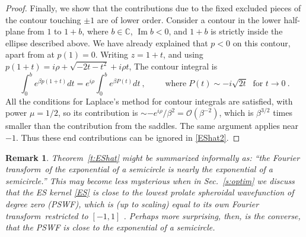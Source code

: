 \documentclass[10pt]{article}
\newcommand{\bigO}{{\mathcal O}}
\DeclareMathOperator{\im}{Im}
\newtheorem{rmk}[thm]{Remark}
\newcommand{\freq}{\beta}          %
\newcommand{\FT}{Fourier transform}
\begin{document}
\begin{proof}
Finally, we show that the contributions due to the fixed excluded
pieces of the contour touching $\pm1$ are of lower order.
Consider a contour in the lower half-plane
from $1$ to $1+b$, where $b\in\mathbb{C}$, $\im b<0$,
and $1+b$ is strictly inside the ellipse described above.
We have already explained that $p<0$ on this contour, apart from at $p(1)=0$.
Writing $z=1+t$, and using $p(1+t) = i\rho + \sqrt{-2t-t^2} + i\rho t$,
The contour integral is
$$ \int_0^b e^{\freq p(1+t)} dt = e^{i\rho}\int_0^b e^{\freq P(t)} dt
~,\qquad \mbox{ where} \; P(t) \sim -i\sqrt{2t} \; \mbox{ for } t\to 0~.
$$
All the conditions for
Laplace's method for contour integrals \cite[Thm.~6.1, p.~125]{olver}
are satisfied, with power $\mu=1/2$,
so its contribution is $\sim -e^{i\rho}/\freq^2 = \bigO(\freq^{-2})$,
which is $\freq^{3/2}$ times smaller than the contribution from the saddles.
The same argument applies near $-1$.
Thus these end contributions can be ignored in \eqref{EShat2}.
\end{proof}

\begin{rmk}
  Theorem~\ref{t:EShat} might be summarized informally as:
  ``the \FT\ of the exponential
  of a semicircle is nearly the exponential of a semicircle.''
  This may become less mysterious when
    in Sec.~\ref{s:optim} we discuss that
    the ES kernel \eqref{ES} is close
    to the lowest prolate spheroidal wavefunction of degree zero (PSWF),
    which is (up to scaling)
    equal to its own \FT\ restricted to $[-1,1]$ \cite{osipov}.
    Perhaps more
    surprising, then, is the converse, that the PSWF is close to the exponential
    of a semicircle. %
%
\end{rmk}  
\end{document}
